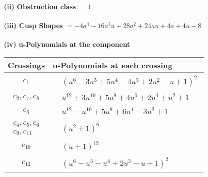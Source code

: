 \documentclass[1p]{elsarticle_modified}
\theoremstyle{definition}
\begin{document}
\flushleft \textbf{(ii) Obstruction class $= 1$}\\~\\
\flushleft \textbf{(iii) Cusp Shapes $= -4 a^4-16 a^3 u+28 a^2+24 a u+4 a+4 u-8$}\\~\\
\newpage\renewcommand{\arraystretch}{1}
\flushleft \textbf{(iv) u-Polynomials at the component}\newline \\
\begin{tabular}{m{50pt}|m{274pt}}
Crossings & \hspace{64pt}u-Polynomials at each crossing \\
\hline $$\begin{aligned}c_{1}\end{aligned}$$&$\begin{aligned}
&(u^6-3 u^5+5 u^4-4 u^3+2 u^2- u+1)^2
\end{aligned}$\\
\hline $$\begin{aligned}c_{2},c_{7},c_{8}\end{aligned}$$&$\begin{aligned}
&u^{12}+3 u^{10}+5 u^8+4 u^6+2 u^4+u^2+1
\end{aligned}$\\
\hline $$\begin{aligned}c_{3}\end{aligned}$$&$\begin{aligned}
&u^{12}- u^{10}+5 u^8+6 u^4-3 u^2+1
\end{aligned}$\\
\hline $$\begin{aligned}c_{4},c_{5},c_{6}\\c_{9},c_{11}\end{aligned}$$&$\begin{aligned}
&(u^2+1)^6
\end{aligned}$\\
\hline $$\begin{aligned}c_{10}\end{aligned}$$&$\begin{aligned}
&(u+1)^{12}
\end{aligned}$\\
\hline $$\begin{aligned}c_{12}\end{aligned}$$&$\begin{aligned}
&(u^6- u^5- u^4+2 u^3- u+1)^2
\end{aligned}$\\
\hline
\end{tabular}\\~\\
\end{document}
